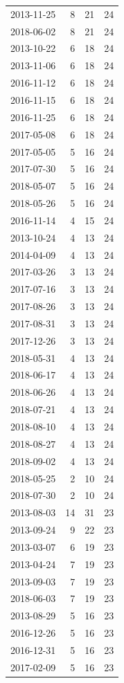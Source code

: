 \begin{tabular}{lrrr}
2013-11-25 & 8 & 21 & 24 \\
2018-06-02 & 8 & 21 & 24 \\
2013-10-22 & 6 & 18 & 24 \\
2013-11-06 & 6 & 18 & 24 \\
2016-11-12 & 6 & 18 & 24 \\
2016-11-15 & 6 & 18 & 24 \\
2016-11-25 & 6 & 18 & 24 \\
2017-05-08 & 6 & 18 & 24 \\
2017-05-05 & 5 & 16 & 24 \\
2017-07-30 & 5 & 16 & 24 \\
2018-05-07 & 5 & 16 & 24 \\
2018-05-26 & 5 & 16 & 24 \\
2016-11-14 & 4 & 15 & 24 \\
2013-10-24 & 4 & 13 & 24 \\
2014-04-09 & 4 & 13 & 24 \\
2017-03-26 & 3 & 13 & 24 \\
2017-07-16 & 3 & 13 & 24 \\
2017-08-26 & 3 & 13 & 24 \\
2017-08-31 & 3 & 13 & 24 \\
2017-12-26 & 3 & 13 & 24 \\
2018-05-31 & 4 & 13 & 24 \\
2018-06-17 & 4 & 13 & 24 \\
2018-06-26 & 4 & 13 & 24 \\
2018-07-21 & 4 & 13 & 24 \\
2018-08-10 & 4 & 13 & 24 \\
2018-08-27 & 4 & 13 & 24 \\
2018-09-02 & 4 & 13 & 24 \\
2018-05-25 & 2 & 10 & 24 \\
2018-07-30 & 2 & 10 & 24 \\
2013-08-03 & 14 & 31 & 23 \\
2013-09-24 & 9 & 22 & 23 \\
2013-03-07 & 6 & 19 & 23 \\
2013-04-24 & 7 & 19 & 23 \\
2013-09-03 & 7 & 19 & 23 \\
2018-06-03 & 7 & 19 & 23 \\
2013-08-29 & 5 & 16 & 23 \\
2016-12-26 & 5 & 16 & 23 \\
2016-12-31 & 5 & 16 & 23 \\
2017-02-09 & 5 & 16 & 23 \\

\end{tabular}
